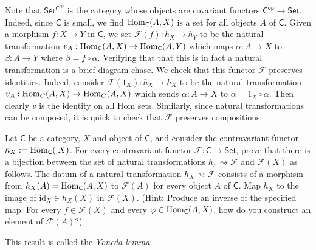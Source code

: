 \documentclass[../../master.tex]{subfiles}
\begin{document}
\begin{solution}
    Note that $\mathsf{Set^{C^{op}}}$ is the category whose objects are covariant functors $\mathsf{C^{op}} \to \mathsf{Set}$.
    Indeed, since $\mathsf{C}$ is small, we find $\operatorname{Hom}_{\mathsf{C}}(A, X)$ is a set for all objects $A$ of $\mathsf{C}$.
    Given a morphism $f: X \to Y$ in $\mathsf{C}$, we set $\mathscr{F}(f):h_X \to h_Y$ to be the natural transformation $v_A: \operatorname{Hom}_{\mathsf{C}}(A, X) \to \operatorname{Hom}_{\mathsf{C}}(A, Y)$ which maps $\alpha: A \to X$ to $\beta: A \to Y$ where $\beta = f \circ \alpha$.
    Verifying that that this is in fact a natural transformation is a brief diagram chase.
    We check that this functor $\mathscr{F}$ preserves identities.
    Indeed, consider $\mathscr{F}(1_X) : h_X \to h_X$ to be the natural transformation $v_A: \operatorname{Hom}_C(A, X) \to \operatorname{Hom}_C(A, X)$ which sends $\alpha: A \to X$ to $\alpha = 1_X \circ \alpha$.
    Then clearly $v$ is the identity on all Hom sets.
    Similarly, since natural transformations can be composed, it is quick to check that $\mathscr{F}$ preserves compositions.
\end{solution}

\begin{problem}
    Let $\mathsf{C}$ be a category, $X$ and object of $\mathsf{C}$, and consider the contravariant functor $h_X := \operatorname{Hom}_{\mathsf{C}}(_, X)$.
    For every contravariant functor $\mathscr{F} : \mathsf{C} \to \mathsf{Set}$, prove that there is a bijection between the set of natural transformations $h_x \rightsquigarrow \mathscr{F}$ and $\mathscr{F}(X)$ as follows.
    The datum of a natural transformation $h_X \rightsquigarrow \mathscr{F}$ consists of a morphism from $h_X(A) = \operatorname{Hom}_{\mathsf{C}}(A, X)$ to $\mathscr{F}(A)$ for every object $A$ of $\mathsf{C}$.
    Map $h_X$ to the image of $\text{id}_X \in h_X(X)$ in $\mathscr{F}(X)$.
    (Hint: Produce an inverse of the specified map.
    For every $f \in \mathscr{F}(X)$ and every $\varphi \in \operatorname{Hom}_{\mathsf{C}}(A, X)$, how do you construct an element of $\mathscr{F}(A)$?)

    This result is called the \textit{Yoneda lemma}.
\end{problem}
\end{document}

